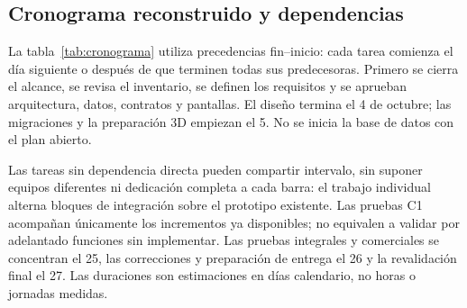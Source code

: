 \documentclass[12pt,letterpaper]{article}
\begin{document}
\subsection{Cronograma reconstruido y dependencias}
La tabla~\ref{tab:cronograma} utiliza precedencias fin--inicio: cada tarea comienza el día siguiente o después de que terminen todas sus predecesoras. Primero se cierra el alcance, se revisa el inventario, se definen los requisitos y se aprueban arquitectura, datos, contratos y pantallas. El diseño termina el 4 de octubre; las migraciones y la preparación 3D empiezan el 5. No se inicia la base de datos con el plan abierto.

Las tareas sin dependencia directa pueden compartir intervalo, sin suponer equipos diferentes ni dedicación completa a cada barra: el trabajo individual alterna bloques de integración sobre el prototipo existente. Las pruebas C1 acompañan únicamente los incrementos ya disponibles; no equivalen a validar por adelantado funciones sin implementar. Las pruebas integrales y comerciales se concentran el 25, las correcciones y preparación de entrega el 26 y la revalidación final el 27. Las duraciones son estimaciones en días calendario, no horas o jornadas medidas.
\end{document}
